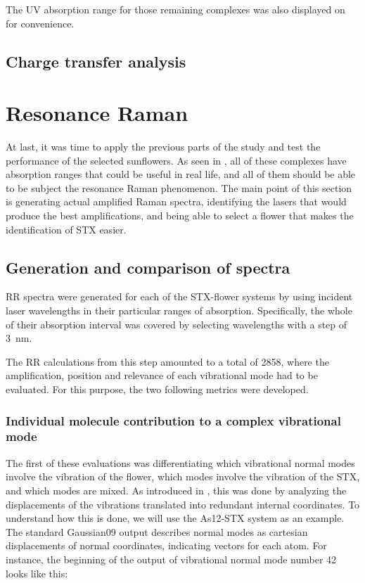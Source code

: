 The UV absorption range for those remaining complexes was also displayed on  for convenience.
\blindtext

\subsection{Charge transfer analysis}
\blindtext

\section{Resonance Raman}
At last, it was time to apply the previous parts of the study and test the performance of the selected sunflowers.
As seen in , all of these complexes have absorption ranges that could be useful in real life, and all of them should be able to be subject the resonance Raman phenomenon.
The main point of this section is generating actual amplified Raman spectra, identifying the lasers that would produce the best amplifications, and being able to select a flower that makes the identification of STX easier.

\subsection{Generation and comparison of spectra}
RR spectra were generated for each of the STX-flower systems by using incident laser wavelengths in their particular ranges of absorption.
Specifically, the whole of their absorption interval was covered by selecting wavelengths with a step of \SI{3}{\nano\metre}.

The RR calculations from this step amounted to a total of 2858, where the amplification, position and relevance of each vibrational mode had to be evaluated.
For this purpose, the two following metrics were developed.

\subsubsection{Individual molecule contribution to a complex vibrational mode}
The first of these evaluations was differentiating which vibrational normal modes involve the vibration of the flower, which modes involve the vibration of the STX, and which modes are mixed.
As introduced in , this was done by analyzing the displacements of the vibrations translated into redundant internal coordinates.
To understand how this is done, we will use the As12-STX system as an example.
The standard Gaussian09 output describes normal modes as cartesian displacements of normal coordinates, indicating vectors for each atom.
For instance, the beginning of the output of vibrational normal mode number 42 looks like this:


